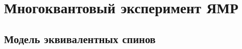\section{Многоквантовый эксперимент ЯМР}
% 
% 
% 
%     
% 
%     
%     
%     
% 
% 

\subsection{Модель эквивалентных спинов}
% 
% 

